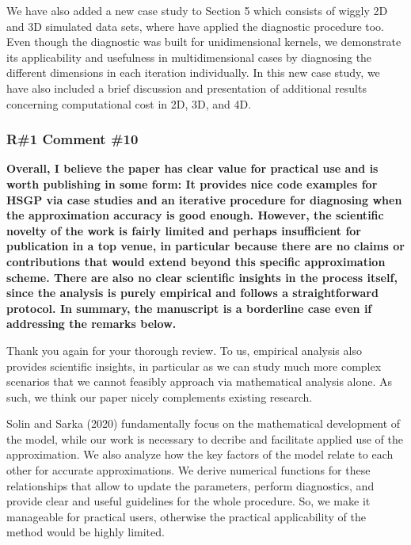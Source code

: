 \documentclass[11pt]{report}
\begin{document}


We have also added a new case study to Section 5 which consists of wiggly 2D and 3D simulated data sets, where have applied the diagnostic procedure too. Even though the diagnostic was built for unidimensional kernels, we demonstrate its applicability and usefulness in multidimensional cases by diagnosing the different dimensions in each iteration individually. 
In this new case study, we have also included a brief discussion and presentation of additional results concerning computational cost in 2D, 3D, and 4D.

\subsubsection*{R\#1 Comment \#10}

\textbf{Overall, I believe the paper has clear value for practical use and is worth publishing in some form: It provides nice code examples for HSGP via case studies and an iterative procedure for diagnosing when the approximation accuracy is good enough. However, the scientific novelty of the work is fairly limited and perhaps insufficient for publication in a top venue, in particular because there are no claims or contributions that would extend beyond this specific approximation scheme. There are also no clear scientific insights in the process itself, since the analysis is purely empirical and follows a straightforward protocol. In summary, the manuscript is a borderline case even if addressing the remarks below.}

Thank you again for your thorough review. To us, empirical analysis also provides scientific insights, in particular as we can study much more complex scenarios that we cannot feasibly approach via mathematical analysis alone. As such, we think our paper nicely complements existing research.

Solin and Sarka (2020) fundamentally focus on the mathematical development of the model, while our work is necessary to decribe and facilitate applied use of the approximation. We also analyze how the key factors of the model relate to each other for accurate approximations. We derive numerical functions for these relationships that allow to update the parameters, perform diagnostics, and provide clear and useful guidelines for the whole procedure. So, we make it manageable for practical users, otherwise the practical applicability of the method would be highly limited.
\end{document}
